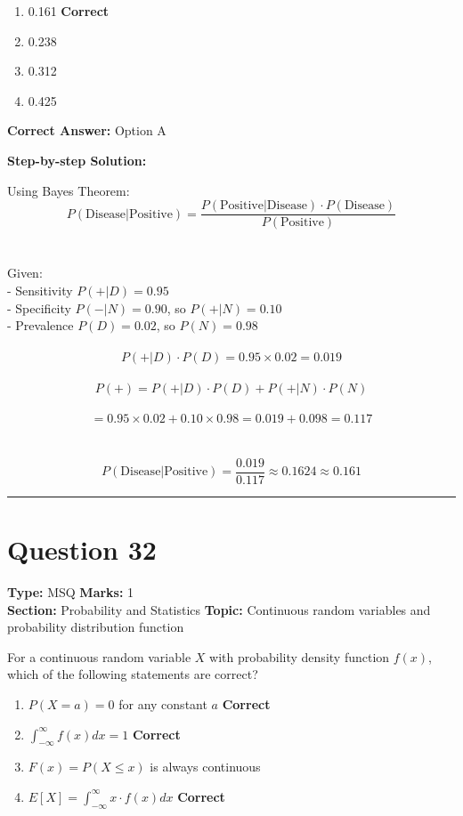 \documentclass[11pt]{article}
\begin{document}
\begin{enumerate}[label=\textbf{\Alph*.}, leftmargin=1.8em]
\item 0.161 \hfill {\color{gategreen}\textbf{Correct}}\item 0.238\item 0.312\item 0.425\end{enumerate}

\textbf{Correct Answer:} Option A

\textbf{Step-by-step Solution:}

Using Bayes Theorem: \\
\[P(\text{Disease}|\text{Positive}) = \frac{P(\text{Positive}|\text{Disease}) \cdot P(\text{Disease})}{P(\text{Positive})}\] \\
\\
Given: \\
- Sensitivity \(P(+|D) = 0.95\) \\
- Specificity \(P(-|N) = 0.90\), so \(P(+|N) = 0.10\) \\
- Prevalence \(P(D) = 0.02\), so \(P(N) = 0.98\) \\
\\
\[P(+|D) \cdot P(D) = 0.95 \times 0.02 = 0.019\] \\
\[P(+) = P(+|D) \cdot P(D) + P(+|N) \cdot P(N)\] \\
\[= 0.95 \times 0.02 + 0.10 \times 0.98 = 0.019 + 0.098 = 0.117\] \\
\\
\[P(\text{Disease}|\text{Positive}) = \frac{0.019}{0.117} \approx 0.1624 \approx 0.161\]

\vspace{0.8em}
\hrule
\vspace{0.4em}
\section*{Question 32}
\textbf{Type:} MSQ \hfill \textbf{Marks:} 1\\
\textbf{Section:} Probability and Statistics \hfill \textbf{Topic:} Continuous random variables and probability distribution function

For a continuous random variable \(X\) with probability density function \(f(x)\), which of the following statements are correct?


\begin{enumerate}[label=\textbf{\Alph*.}, leftmargin=1.8em]
\item \(P(X = a) = 0\) for any constant \(a\) \hfill {\color{gategreen}\textbf{Correct}}\item \(\int_{-\infty}^{\infty} f(x) dx = 1\) \hfill {\color{gategreen}\textbf{Correct}}\item \(F(x) = P(X \leq x)\) is always continuous\item \(E[X] = \int_{-\infty}^{\infty} x \cdot f(x) dx\) \hfill {\color{gategreen}\textbf{Correct}}\end{enumerate}
\end{document}
